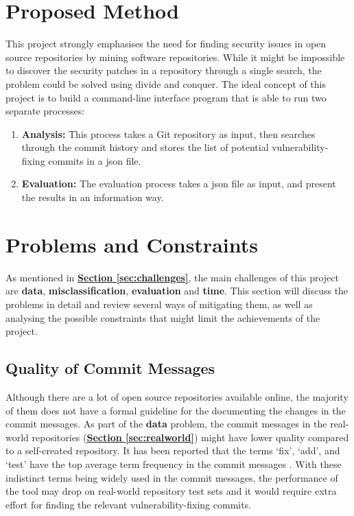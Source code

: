 \documentclass[12pt, a4paper]{report}
\begin{document}
\section{Proposed Method} \label{sec:proposed_method}
This project strongly emphasises the need for finding security issues in open source repositories by
mining software repositories. While it might be impossible to discover the security patches in a
repository through a single search, the problem could be solved using divide and conquer. The ideal
concept of this project is to build a command-line interface program that is able to run two
separate processes:
\begin{enumerate}
  \item \textbf{Analysis:} This process takes a Git repository as input, then searches through the
  commit history and stores the list of potential vulnerability-fixing commits in a \acrshort{json}
  file.
  \item \textbf{Evaluation:} The evaluation process takes a \acrshort{json} file as input, and
  present the results in an information way.
\end{enumerate}

\section{Problems and Constraints} \label{sec:problems_and_constraints}
As mentioned in \hyperref[sec:challenges]{\textbf{Section \ref*{sec:challenges}}}, the main
challenges of this project are \textbf{data}, \textbf{misclassification}, \textbf{evaluation} and
\textbf{time}. This section will discuss the problems in detail and review several ways of
mitigating them, as well as analysing the possible constraints that might limit the achievements of
the project.

\subsection{Quality of Commit Messages} \label{subsec:commit_quality}
Although there are a lot of open source repositories available online, the majority of them does not
have a formal guideline for the documenting the changes in the commit messages. As part of the
\textbf{data} problem, the commit messages in the real-world repositories
(\hyperref[sec:realworld]{\textbf{Section \ref*{sec:realworld}}}) might have lower quality compared
to a self-created repository. It has been reported that the terms `fix', `add', and `test' have the
top average term frequency in the commit messages \cite{alali_2008}. With these indistinct terms
being widely used in the commit messages, the performance of the tool may drop on real-world
repository test sets and it would require extra effort for finding the relevant vulnerability-fixing
commits.
\end{document}
